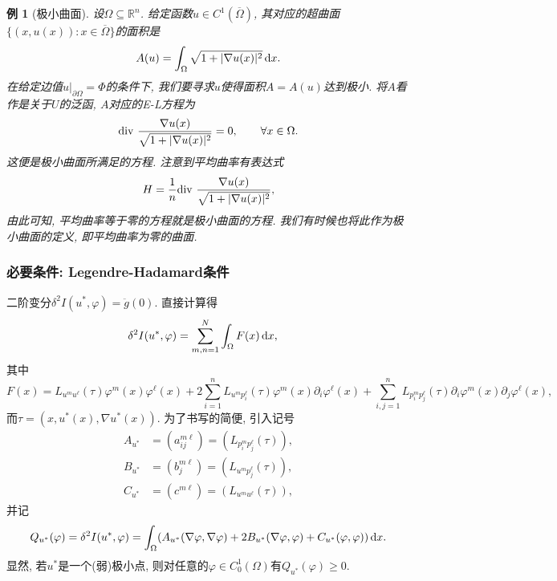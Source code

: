 \documentclass[12pt,a4paper]{article}
\newtheorem{example}[theorem]{例}
\begin{document}
\begin{example}[极小曲面]
    设$\Omega \subseteq \mathbb{R}^n$. 给定函数$u \in C^1(\overline{\Omega})$, 其对应的超曲面$\{(x, u(x))\colon x \in \overline{\Omega}\}$的面积是
    \begin{equation*}
        A(u) = \int_{\Omega}\sqrt{1 + |\nabla u(x)|^2} \,{\rm d}x.
    \end{equation*}
    在给定边值$u|_{\partial\Omega} = \Phi$的条件下, 我们要寻求$u$使得面积$A = A(u)$达到极小. 将$A$看作是关于$U$的泛函, $A$对应的E-L方程为 
    \begin{equation*}
        {\rm div}\ \frac{\nabla u(x)}{\sqrt{1 + |\nabla u(x)|^2}} = 0, \qquad \forall x \in \Omega.
    \end{equation*}
    这便是极小曲面所满足的方程. 注意到平均曲率有表达式
    \begin{equation*}
        H = \frac{1}{n}{\rm div}\ \frac{\nabla u(x)}{\sqrt{1 + |\nabla u(x)|^2}},
    \end{equation*}
    由此可知, 平均曲率等于零的方程就是极小曲面的方程. 我们有时候也将此作为极小曲面的定义, 即平均曲率为零的曲面.
\end{example}

\subsubsection{必要条件: Legendre-Hadamard条件}

二阶变分$\delta^2I(u^*, \varphi) = \ddot g(0)$. 直接计算得 
\begin{align*}
    \delta^2I(u^*, \varphi) &= \sum_{m, n = 1}^N\int_{\Omega} F(x) \,{\rm d}x,
\end{align*}
其中 
\begin{equation*}
    F(x) = L_{u^mu^\ell}(\tau)\varphi^m(x)\varphi^\ell(x) + 2\sum_{i = 1}^nL_{u^mp^\ell_i}(\tau)\varphi^m(x)\partial_i\varphi^{\ell}(x) + \sum_{i, j = 1}^nL_{p^m_ip^{\ell}_j}(\tau)\partial_i\varphi^m(x)\partial_j\varphi^\ell(x),
\end{equation*}
而$\tau = (x, u^*(x), \nabla u^*(x))$. 为了书写的简便, 引入记号 
\begin{align*}
    A_{u^*} &= (a_{ij}^{m\ell}) = (L_{p^m_ip^{\ell}_j}(\tau)), \\ 
    B_{u^*} &= (b_j^{m\ell}) = (L_{u^mp^\ell_j}(\tau)), \\ 
    C_{u^*} &= (c^{m\ell}) = (L_{u^mu^\ell}(\tau)),
\end{align*}
并记
\begin{equation*}
    Q_{u^*}(\varphi) = \delta^2I(u^*, \varphi) = \int_{\Omega}(A_{u^*}(\nabla\varphi, \nabla\varphi) + 2B_{u^*}(\nabla\varphi, \varphi) + C_{u^*}(\varphi, \varphi)) \,{\rm d}x.
\end{equation*}
显然, 若$u^*$是一个(弱)极小点, 则对任意的$\varphi \in C_0^1(\Omega)$有$Q_{u^*}(\varphi) \geq 0$.
\end{document}
